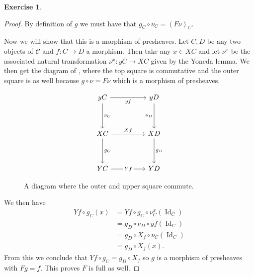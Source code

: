\documentclass{article}
\DeclareMathOperator{\Id}{Id}
\newcommand{\cat}{\mathcal{C}}
\theoremstyle{definition}
\newtheorem{question}{Exercise}
\begin{document}
\begin{question}
\begin{enumerate}[(a)]
\begin{proof}
                  By definition of \(g\) we must have that
                  \(g_{C}\circ\nu_{C}=(F\nu)_{C}\).

                  Now we will show that this is a morphism of presheaves. Let
                  \(C,D\) be any two objects of \(\cat\) and \(f:C\to D\) a
                  morphism. Then take any \(x\in XC\) and let \(\nu^{x}\) be the
                  associated natural transformation \(\nu^{x}:yC\to XC\) given
                  by the Yoneda lemma. We then get the diagram of
                  , where the top square is commutative and
                  the outer square is as well because \(g\circ\nu=F\nu\) which
                  is a morphism of presheaves.
                  \begin{figure}[H]
                      \[
                          \begin{tikzcd}[ampersand replacement=\&]
                              yC \&\& yD \\
                              \\
                              XC \&\& XD \\
                              \\
                              YC \&\& YD
                              \arrow["yf"', from=1-1, to=1-3]
                              \arrow["{\nu_{C}}", from=1-1, to=3-1]
                              \arrow["{\nu_{D}}"', from=1-3, to=3-3]
                              \arrow["Xf", from=3-1, to=3-3]
                              \arrow["{g_{C}}", from=3-1, to=5-1]
                              \arrow["{g_{D}}", from=3-3, to=5-3]
                              \arrow["Yf"{description}, from=5-1, to=5-3]
                          \end{tikzcd}
                      \]
                      \caption{A diagram where the outer and upper square commute.}
                      \label{fig:comm-dia-3}
                  \end{figure}
                  We then have
                  \begin{align*}
                      Yf\circ g_{C}(x) & =Yf\circ g_{C}\circ\nu^{x}_{C}(\Id_{C}) \\
                                       & =g_{D}\circ\nu_{D}\circ yf(\Id_{C})     \\
                                       & =g_{D}\circ X_{f}\circ\nu_{C}(\Id_{C})  \\
                                       & =g_{D}\circ X_{f}(x).
                  \end{align*}
                  From this we conclude that \(Yf\circ g_{C}=g_{D}\circ X_{f}\)
                  so \(g\) is a morphism of presheaves with \(Fg=f\). This
                  proves
                  \(F\) is full as well.


\end{proof}
\end{enumerate}
\end{question}
\end{document}
